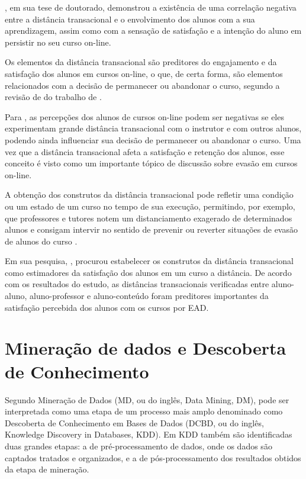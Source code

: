 , em sua tese de doutorado, demonstrou a
existência de uma correlação negativa entre a distância transacional e o
envolvimento dos alunos com a sua aprendizagem, assim como com a sensação de
satisfação e a intenção do aluno em persistir no seu curso on-line.

Os elementos da distância transacional são preditores do engajamento e da
satisfação dos alunos em cursos on-line, o que, de certa forma, são elementos
relacionados com a decisão de permanecer ou abandonar o curso, segundo a revisão
de  do trabalho de
.

Para , as percepções dos alunos de cursos
on-line podem ser negativas se eles experimentam grande distância transacional
com o instrutor e com outros alunos, podendo ainda influenciar sua decisão de
permanecer ou abandonar o curso. Uma vez que a distância transacional afeta a
satisfação e retenção dos alunos, esse conceito é visto como um importante
tópico de discussão sobre evasão em cursos on-line.

A obtenção dos construtos da distância transacional pode refletir uma condição
ou um estado de um curso no tempo de sua execução, permitindo, por exemplo, que
professores e tutores notem um distanciamento exagerado de determinados alunos e
consigam intervir no sentido de prevenir ou reverter situações de evasão de
alunos do curso \cite{horzum2011developing}.

Em sua pesquisa, , procurou estabelecer os
construtos da distância transacional como estimadores da satisfação dos alunos
em um curso a distância. De acordo com os resultados do estudo, as distâncias
transacionais verificadas entre aluno-aluno, aluno-professor e aluno-conteúdo
foram preditores importantes da satisfação percebida dos alunos com os cursos
por EAD.

\section{Mineração de dados e Descoberta de Conhecimento}

Segundo  Mineração de Dados (MD, ou do inglês,
Data Mining, DM), pode ser interpretada como uma etapa de um processo mais amplo
denominado como Descoberta de Conhecimento em Bases de Dados (DCBD, ou do
inglês, Knowledge Discovery in Databases, KDD). Em KDD também são identificadas
duas grandes etapas: a de pré-processamento de dados, onde os dados são captados
tratados e organizados, e a de pós-processamento dos resultados obtidos da etapa
de mineração.


